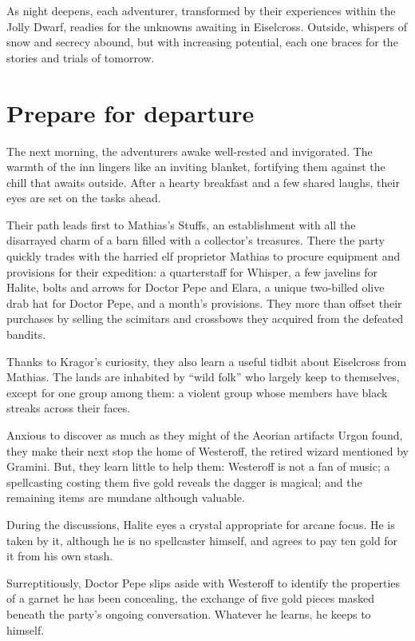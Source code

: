 \documentclass[
  letterpaper,12pt,twoside,twocolumn,openany,
  nodeprecatedcode,bg=full]{dndbook}
\begin{document}
As night deepens, each adventurer, transformed by their experiences
within the Jolly Dwarf, readies for the unknowns awaiting in Eiselcross.
Outside, whispers of snow and secrecy abound, but with increasing
potential, each one braces for the stories and trials of tomorrow.

\section{Prepare for departure}\label{prepare-for-departure}

The next morning, the adventurers awake well-rested and invigorated. The
warmth of the inn lingers like an inviting blanket, fortifying them
against the chill that awaits outside. After a hearty breakfast and a
few shared laughs, their eyes are set on the tasks ahead.

Their path leads first to Mathias's Stuffs, an establishment with all
the disarrayed charm of a barn filled with a collector's treasures.
There the party quickly trades with the harried elf proprietor Mathias
to procure equipment and provisions for their expedition: a quarterstaff
for Whisper, a few javelins for Halite, bolts and arrows for Doctor Pepe
and Elara, a unique two-billed olive drab hat for Doctor Pepe, and a
month's provisions. They more than offset their purchases by selling the
scimitars and crossbows they acquired from the defeated bandits.

Thanks to Kragor's curiosity, they also learn a useful tidbit about
Eiselcross from Mathias. The lands are inhabited by ``wild folk'' who
largely keep to themselves, except for one group among them: a violent
group whose members have black streaks across their faces.

Anxious to discover as much as they might of the Aeorian artifacts Urgon
found, they make their next stop the home of Westeroff, the retired
wizard mentioned by Gramini. But, they learn little to help them:
Westeroff is not a fan of music; a spellcasting costing them five gold
reveals the dagger is magical; and the remaining items are mundane
although valuable.

During the discussions, Halite eyes a crystal appropriate for arcane
focus. He is taken by it, although he is no spellcaster himself, and
agrees to pay ten gold for it from his own stash.

Surreptitiously, Doctor Pepe slips aside with Westeroff to identify the
properties of a garnet he has been concealing, the exchange of five gold
pieces masked beneath the party's ongoing conversation. Whatever he
learns, he keeps to himself.
\end{document}
